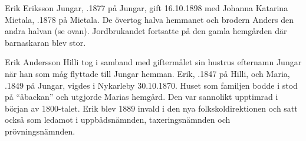 Erik Eriksson Jungar, .1877 på Jungar, gift 16.10.1898 med Johanna Katarina Mietala, .1878 på Mietala. De övertog halva hemmanet och brodern Anders den andra halvan (se ovan). Jordbrukandet fortsatte på den gamla hemgården där barnaskaran blev stor.
\begin{jhchildren}
  \item {}
  \item {}
  \item {}
  \item {}
  \item {}
  \item {}
  \item {}
  \item {}
  \item {}
  \item {}
\end{jhchildren}


Erik Andersson Hilli tog i samband med giftermålet sin hustrus efternamn Jungar när han som måg flyttade till Jungar hemman. Erik, .1847 på Hilli, och Maria, .1849 på Jungar, vigdes i Nykarleby 30.10.1870. Huset som familjen bodde i stod på ``åbackan'' och utgjorde Marias hemgård. Den var sannolikt upptimrad i början av 1800-talet. Erik blev 1889 invald i den nya folkskoldirektionen och satt också som ledamot i uppbådsnämnden, taxeringsnämnden och prövningsnämnden.

